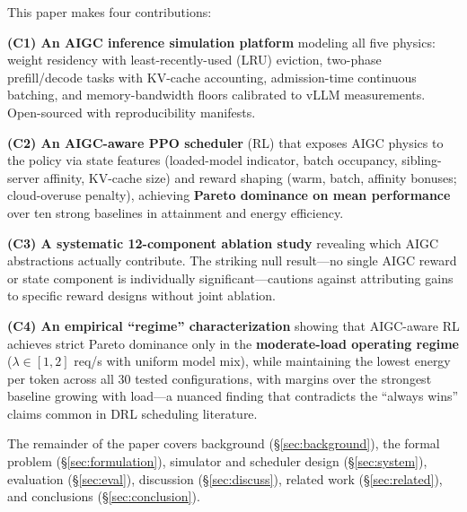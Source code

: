 \smallskip
\noindent This paper makes four contributions:

\noindent\textbf{(C1) An AIGC inference simulation platform}
modeling all five physics: weight residency with
least-recently-used (LRU) eviction, two-phase prefill/decode
tasks with KV-cache accounting, admission-time continuous
batching, and memory-bandwidth floors calibrated to vLLM
measurements. Open-sourced with reproducibility manifests.

\noindent\textbf{(C2) An AIGC-aware PPO scheduler} (RL) that
exposes AIGC physics to the policy via state features
(loaded-model indicator, batch occupancy, sibling-server
affinity, KV-cache size) and reward shaping (warm, batch,
affinity bonuses; cloud-overuse penalty), achieving
\textbf{Pareto dominance on mean performance} over
ten strong baselines
in \slo{} attainment and energy efficiency.

\noindent\textbf{(C3) A systematic 12-component ablation study}
revealing which AIGC abstractions actually contribute. The
striking null result---no single AIGC reward or state
component is individually significant---cautions against
attributing gains to specific reward designs without joint
ablation.

\noindent\textbf{(C4) An empirical ``regime'' characterization}
showing that AIGC-aware RL achieves strict Pareto dominance only
in the \textbf{moderate-load operating regime}
($\lambda \in [1, 2]$ req/s with uniform model mix), while
maintaining the lowest energy per token across
all 30 tested configurations, with margins over the strongest
baseline growing with load---a nuanced finding that contradicts
the ``always wins'' claims common in DRL scheduling literature.

\smallskip
The remainder of the paper covers background
(\S\ref{sec:background}), the formal problem
(\S\ref{sec:formulation}), simulator and scheduler design
(\S\ref{sec:system}), evaluation (\S\ref{sec:eval}),
discussion (\S\ref{sec:discuss}), related work
(\S\ref{sec:related}), and conclusions
(\S\ref{sec:conclusion}).
